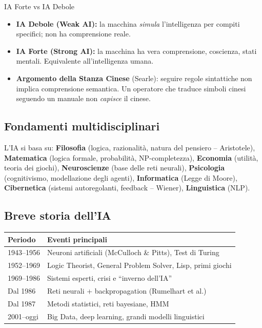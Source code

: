 \documentclass[12pt,a4paper]{article}
\begin{document}
\begin{warnbox}{IA Forte vs IA Debole}
\begin{itemize}[noitemsep]
  \item \textbf{IA Debole (Weak AI):} la macchina \emph{simula} l'intelligenza per compiti specifici; non ha comprensione reale.
  \item \textbf{IA Forte (Strong AI):} la macchina ha vera comprensione, coscienza, stati mentali. Equivalente all'intelligenza umana.
  \item \textbf{Argomento della Stanza Cinese} (Searle): seguire regole sintattiche non implica comprensione semantica. Un operatore che traduce simboli cinesi seguendo un manuale non \emph{capisce} il cinese.
\end{itemize}
\end{warnbox}

\subsection{Fondamenti multidisciplinari}

L'IA si basa su: \textbf{Filosofia} (logica, razionalità, natura del pensiero -- Aristotele), \textbf{Matematica} (logica formale, probabilità, NP-completezza), \textbf{Economia} (utilità, teoria dei giochi), \textbf{Neuroscienze} (base delle reti neurali), \textbf{Psicologia} (cognitivismo, modellazione degli agenti), \textbf{Informatica} (Legge di Moore), \textbf{Cibernetica} (sistemi autoregolanti, feedback -- Wiener), \textbf{Linguistica} (NLP).

\subsection{Breve storia dell'IA}

\begin{center}
\begin{tabular}{ll}
\toprule
\textbf{Periodo} & \textbf{Eventi principali} \\
\midrule
1943--1956 & Neuroni artificiali (McCulloch \& Pitts), Test di Turing \\
1952--1969 & Logic Theorist, General Problem Solver, Lisp, primi giochi \\
1969--1986 & Sistemi esperti, crisi e ``inverno dell'IA'' \\
Dal 1986 & Reti neurali + backpropagation (Rumelhart et al.) \\
Dal 1987 & Metodi statistici, reti bayesiane, HMM \\
2001--oggi & Big Data, deep learning, grandi modelli linguistici \\
\bottomrule
\end{tabular}
\end{center}
\end{document}
